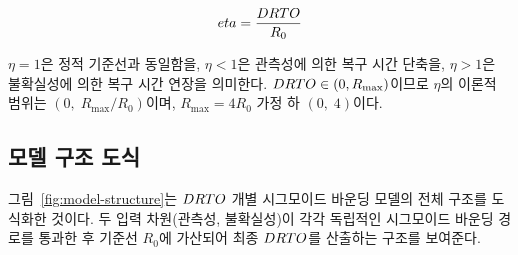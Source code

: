 \begin{equation}
  eta = \frac{DRTO}{R_0}
  \label{eq:eta}
\end{equation}

$\eta = 1$은 정적 기준선과 동일함을, $\eta < 1$은 관측성에 의한 복구 시간 단축을,
$\eta > 1$은 불확실성에 의한 복구 시간 연장을 의미한다.
$DRTO \in (0, R_{\max})$이므로 $\eta$의 이론적 범위는
$(0,\; R_{\max}/R_0)$이며, $R_{\max} = 4R_0$ 가정 하 $(0,\; 4)$이다.


\subsection{모델 구조 도식}
\label{subsec:model-diagram}

\p{[}그림~\ref{fig:model-structure}\p{]}는 $DRTO$ 개별 시그모이드 바운딩 모델의
전체 구조를 도식화한 것이다. 두 입력 차원(관측성, 불확실성)이
각각 독립적인 시그모이드 바운딩 경로를 통과한 후 기준선 $R_0$에
가산되어 최종 $DRTO$를 산출하는 구조를 보여준다.

